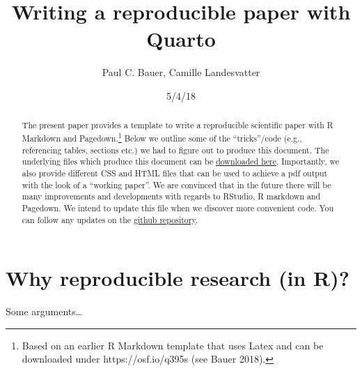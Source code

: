 \documentclass[
  letterpaper,
  DIV=11,
  numbers=noendperiod]{scrartcl}
\title{Writing a reproducible paper with Quarto}
\author{Paul C. Bauer, Camille Landesvatter}
\date{5/4/18}
\renewcommand*\contentsname{Table of contents}
\newcommand\contentsname{Table of contents}
\begin{document}
\maketitle
\begin{abstract}
The present paper provides a template to write a reproducible scientific
paper with R Markdown and Pagedown.\footnote{Based on an earlier R
  Markdown template that uses Latex and can be downloaded under
  https://osf.io/q395s (see Bauer 2018).} Below we outline some of the
``tricks''/code (e.g., referencing tables, sections etc.) we had to
figure out to produce this document. The underlying files which produce
this document can be
\href{https://drive.google.com/drive/folders/1rWzj-Bu1EKqkSuE1gaFzduBJhzlThpkw?usp=sharing}{downloaded
here}. Importantly, we also provide different CSS and HTML files that
can be used to achieve a pdf output with the look of a ``working
paper''. We are convinced that in the future there will be many
improvements and developments with regards to RStudio, R markdown and
Pagedown. We intend to update this file when we discover more convenient
code. You can follow any updates on the
\href{https://github.com/paulcbauer/Writing_a_reproducable_paper_with_quarto/}{github
repository}.
\end{abstract}
\ifdefined\Shaded\renewenvironment{Shaded}{\begin{tcolorbox}[boxrule=0pt, enhanced, interior hidden, borderline west={3pt}{0pt}{shadecolor}, frame hidden, sharp corners, breakable]}{\end{tcolorbox}}\fi

\renewcommand*\contentsname{Table of contents}
{
\hypersetup{linkcolor=}
\setcounter{tocdepth}{3}
\tableofcontents
}
\hypertarget{why-reproducible-research-in-r}{%
\section{Why reproducible research (in
R)?}\label{why-reproducible-research-in-r}}

Some arguments\ldots{}
\end{document}
